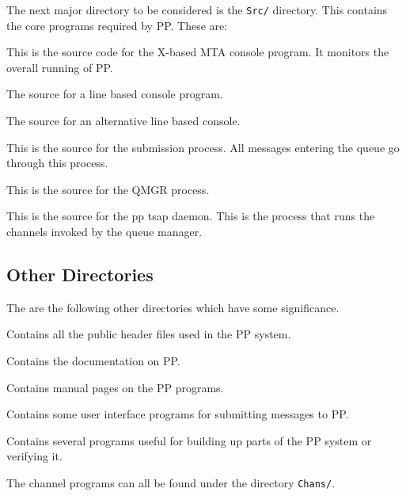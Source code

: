 The next major directory to be considered is the
\verb|Src/| directory. This contains the core programs
required by PP. These are:
\begin{describe}
\item[\verb|MTAconsole/|:]	This is the source
code for the X-based MTA console program. It monitors the overall
running of PP.

\item[\verb|LINEconsole/|:] The source for a line
based console program.

\item[\verb|lconsole/|:] The source for an alternative
line based console.

\item[\verb|submit/|:]	This is the source for the
submission process. All messages entering the queue go through this process.

\item[\verb|qmgr/|:]	This is the source for the
QMGR process.

\item[\verb|pptsapd/|:]	This is the source for the pp
tsap daemon. This is the process that runs the channels invoked by the
queue manager.

\end{describe}

\subsection{Other Directories}
The are the following other directories which have some significance.

\begin{describe}
\item[\verb|h/|:]	Contains all the public header files used in
the PP system.

\item[\verb|doc/|:]	Contains the documentation on PP.

\item[\verb|man/|:]	Contains manual pages on the PP programs.

\item[\verb|Uip/|:]	Contains some user interface programs for
submitting messages to PP.

\item[\verb|Tools/|:]  Contains several programs
useful for building up parts of the PP system or verifying it.

\item[\verb|Chans/|:] The channel programs can all be
found under the directory \verb|Chans/|.
\end{describe}
